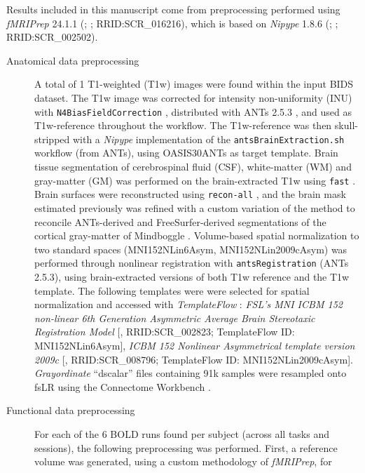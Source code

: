 \documentclass[
]{article}
\author{}
\date{}
\begin{document}
Results included in this manuscript come from preprocessing performed
using \emph{fMRIPrep} 24.1.1 (\citet{fmriprep1}; \citet{fmriprep2};
RRID:SCR\_016216), which is based on \emph{Nipype} 1.8.6
(\citet{nipype1}; \citet{nipype2}; RRID:SCR\_002502).

\begin{description}
\item[Anatomical data preprocessing]
A total of 1 T1-weighted (T1w) images were found within the input BIDS
dataset. The T1w image was corrected for intensity non-uniformity (INU)
with \texttt{N4BiasFieldCorrection} \citep{n4}, distributed with ANTs
2.5.3 \citep[RRID:SCR\_004757]{ants}, and used as T1w-reference
throughout the workflow. The T1w-reference was then skull-stripped with
a \emph{Nipype} implementation of the \texttt{antsBrainExtraction.sh}
workflow (from ANTs), using OASIS30ANTs as target template. Brain tissue
segmentation of cerebrospinal fluid (CSF), white-matter (WM) and
gray-matter (GM) was performed on the brain-extracted T1w using
\texttt{fast} \citep[FSL (version unknown),
RRID:SCR\_002823,][]{fsl_fast}. Brain surfaces were reconstructed using
\texttt{recon-all} \citep[FreeSurfer 7.3.2,
RRID:SCR\_001847,][]{fs_reconall}, and the brain mask estimated
previously was refined with a custom variation of the method to
reconcile ANTs-derived and FreeSurfer-derived segmentations of the
cortical gray-matter of Mindboggle
\citep[RRID:SCR\_002438,][]{mindboggle}. Volume-based spatial
normalization to two standard spaces (MNI152NLin6Asym,
MNI152NLin2009cAsym) was performed through nonlinear registration with
\texttt{antsRegistration} (ANTs 2.5.3), using brain-extracted versions
of both T1w reference and the T1w template. The following templates were
were selected for spatial normalization and accessed with
\emph{TemplateFlow} \citep[24.2.0,][]{templateflow}: \emph{FSL's MNI
ICBM 152 non-linear 6th Generation Asymmetric Average Brain Stereotaxic
Registration Model} {[}\citet{mni152nlin6asym}, RRID:SCR\_002823;
TemplateFlow ID: MNI152NLin6Asym{]}, \emph{ICBM 152 Nonlinear
Asymmetrical template version 2009c} {[}\citet{mni152nlin2009casym},
RRID:SCR\_008796; TemplateFlow ID: MNI152NLin2009cAsym{]}.
\emph{Grayordinate} ``dscalar'' files containing 91k samples were
resampled onto fsLR using the Connectome Workbench \citep{hcppipelines}.
\item[Functional data preprocessing]
For each of the 6 BOLD runs found per subject (across all tasks and
sessions), the following preprocessing was performed. First, a reference
volume was generated, using a custom methodology of \emph{fMRIPrep}, for

\end{description}
\end{document}
